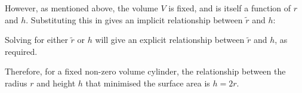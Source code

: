 \documentclass[12pt]{article}
\begin{document}
\vspace{10.5mm}

\begin{mdframed}[linewidth=0.5mm, backgroundcolor=orange!10]
However, as mentioned above, the volume $V$ is fixed, and is itself a function of $r$ and $h$. Substituting this in gives an implicit relationship between $\tilde{r}$ and $h$:
\end{mdframed}

\vspace{10.5mm}

\begin{mdframed}[linewidth=0.5mm, backgroundcolor=orange!10]
Solving for either $\tilde{r}$ or $h$ will give an explicit relationship between $\tilde{r}$ and $h$, as required.
\end{mdframed}

\vspace{10.5mm}

\begin{mdframed}[linewidth=0.5mm, backgroundcolor=orange!10]
Therefore, for a fixed non-zero volume cylinder, the relationship between the radius $r$ and height $h$ that minimised the surface area is $h = 2r$.
\end{mdframed}
\end{document}
